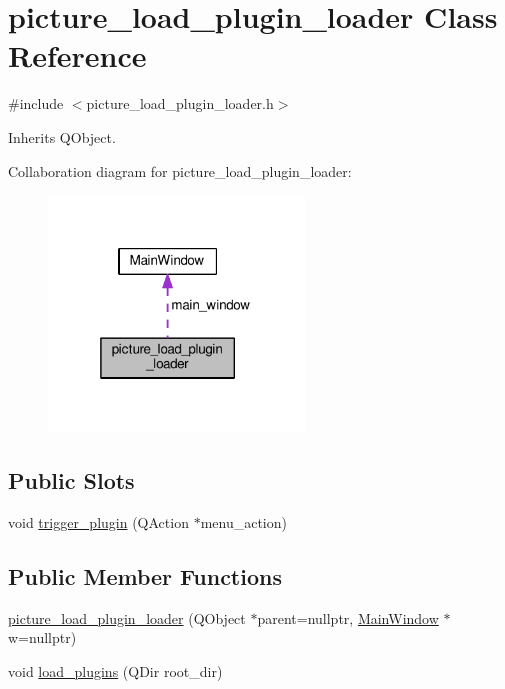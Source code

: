 \hypertarget{classpicture__load__plugin__loader}{}\section{picture\+\_\+load\+\_\+plugin\+\_\+loader Class Reference}
\label{classpicture__load__plugin__loader}


{\ttfamily \#include $<$picture\+\_\+load\+\_\+plugin\+\_\+loader.\+h$>$}



Inherits Q\+Object.



Collaboration diagram for picture\+\_\+load\+\_\+plugin\+\_\+loader\+:\nopagebreak
\begin{figure}[H]
\begin{center}
\leavevmode
\includegraphics[width=193pt]{classpicture__load__plugin__loader__coll__graph}
\end{center}
\end{figure}
\subsection*{Public Slots}
\begin{DoxyCompactItemize}
\item 
void \hyperlink{classpicture__load__plugin__loader_a7e8827db78dabf7872b30305e1f29af0}{trigger\+\_\+plugin} (Q\+Action $\ast$menu\+\_\+action)
\end{DoxyCompactItemize}
\subsection*{Public Member Functions}
\begin{DoxyCompactItemize}
\item 
\hyperlink{classpicture__load__plugin__loader_ac548a57f4e400bc5612428a752a1d59e}{picture\+\_\+load\+\_\+plugin\+\_\+loader} (Q\+Object $\ast$parent=nullptr, \hyperlink{classMainWindow}{Main\+Window} $\ast$w=nullptr)
\item 
void \hyperlink{classpicture__load__plugin__loader_a0e59be47c219103db204896cb89f0720}{load\+\_\+plugins} (Q\+Dir root\+\_\+dir)
\end{DoxyCompactItemize}
